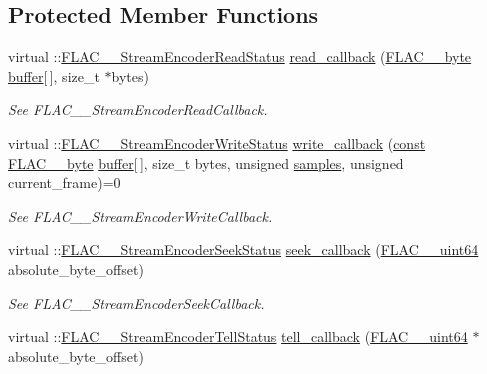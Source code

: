 \subsection*{Protected Member Functions}
\begin{DoxyCompactItemize}
\item 
virtual \+::\hyperlink{group__flac__stream__encoder_ga2e81f007fb0a7414c0bbb453f37ea37f}{F\+L\+A\+C\+\_\+\+\_\+\+Stream\+Encoder\+Read\+Status} \hyperlink{class_f_l_a_c_1_1_encoder_1_1_stream_a973237637c09a14579797c0bc445baf1}{read\+\_\+callback} (\hyperlink{ordinals_8h_a5eb569b12d5b047cdacada4d57924ee3}{F\+L\+A\+C\+\_\+\+\_\+byte} \hyperlink{structbuffer}{buffer}\mbox{[}$\,$\mbox{]}, size\+\_\+t $\ast$bytes)
\begin{DoxyCompactList}\small\item\em See F\+L\+A\+C\+\_\+\+\_\+\+Stream\+Encoder\+Read\+Callback. \end{DoxyCompactList}\item 
virtual \+::\hyperlink{group__flac__stream__encoder_ga3737471fd49730bb8cf9b182bdeda05e}{F\+L\+A\+C\+\_\+\+\_\+\+Stream\+Encoder\+Write\+Status} \hyperlink{class_f_l_a_c_1_1_encoder_1_1_stream_afa6c90811480bb4fccb1cf3da8160c47}{write\+\_\+callback} (\hyperlink{getopt1_8c_a2c212835823e3c54a8ab6d95c652660e}{const} \hyperlink{ordinals_8h_a5eb569b12d5b047cdacada4d57924ee3}{F\+L\+A\+C\+\_\+\+\_\+byte} \hyperlink{structbuffer}{buffer}\mbox{[}$\,$\mbox{]}, size\+\_\+t bytes, unsigned \hyperlink{test__w__saw8_8c_a54185623a5a093f671a73e5fba6197a1}{samples}, unsigned current\+\_\+frame)=0
\begin{DoxyCompactList}\small\item\em See F\+L\+A\+C\+\_\+\+\_\+\+Stream\+Encoder\+Write\+Callback. \end{DoxyCompactList}\item 
virtual \+::\hyperlink{group__flac__stream__encoder_ga6d5be3489f45fcf0c252022c65d87aca}{F\+L\+A\+C\+\_\+\+\_\+\+Stream\+Encoder\+Seek\+Status} \hyperlink{class_f_l_a_c_1_1_encoder_1_1_stream_a2574a6f512b4b309327fd9f36b748d96}{seek\+\_\+callback} (\hyperlink{ordinals_8h_aa78c8c70a3eb8a58af7436f278acde8e}{F\+L\+A\+C\+\_\+\+\_\+uint64} absolute\+\_\+byte\+\_\+offset)
\begin{DoxyCompactList}\small\item\em See F\+L\+A\+C\+\_\+\+\_\+\+Stream\+Encoder\+Seek\+Callback. \end{DoxyCompactList}\item 
virtual \+::\hyperlink{group__flac__stream__encoder_gab628f63181250eb977a28bf12b7dd9ff}{F\+L\+A\+C\+\_\+\+\_\+\+Stream\+Encoder\+Tell\+Status} \hyperlink{class_f_l_a_c_1_1_encoder_1_1_stream_a448456ca34bb7b0a00d2299ab9b39a5e}{tell\+\_\+callback} (\hyperlink{ordinals_8h_aa78c8c70a3eb8a58af7436f278acde8e}{F\+L\+A\+C\+\_\+\+\_\+uint64} $\ast$absolute\+\_\+byte\+\_\+offset)

\end{DoxyCompactItemize}

